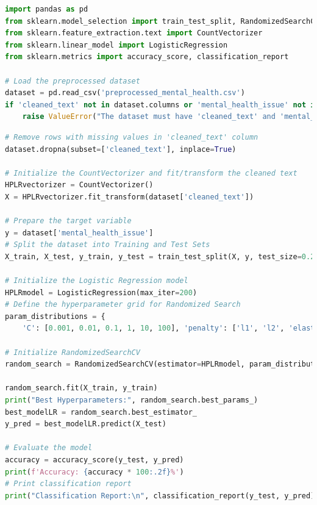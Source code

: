 \begin{tcolorbox}[colback=gray!5!white, colframe=gray!80!black, boxrule=0.5pt, title=Logistic Regression]
\begin{lstlisting}[language=Python]
import pandas as pd
from sklearn.model_selection import train_test_split, RandomizedSearchCV
from sklearn.feature_extraction.text import CountVectorizer
from sklearn.linear_model import LogisticRegression
from sklearn.metrics import accuracy_score, classification_report

# Load the preprocessed dataset
dataset = pd.read_csv('preprocessed_mental_health.csv')
if 'cleaned_text' not in dataset.columns or 'mental_health_issue' not in dataset.columns:
    raise ValueError("The dataset must have 'cleaned_text' and 'mental_health_issue' columns.")
\end{lstlisting}
\end{tcolorbox}

\begin{tcolorbox}[colback=gray!5!white, colframe=gray!80!black, boxrule=0.5pt, title=Logistic Regression]
    \begin{lstlisting}[language=Python]
# Remove rows with missing values in 'cleaned_text' column
dataset.dropna(subset=['cleaned_text'], inplace=True)

# Initialize the CountVectorizer and fit/transform the cleaned text
HPLRvectorizer = CountVectorizer()
X = HPLRvectorizer.fit_transform(dataset['cleaned_text'])

# Prepare the target variable
y = dataset['mental_health_issue']
# Split the dataset into Training and Test Sets
X_train, X_test, y_train, y_test = train_test_split(X, y, test_size=0.2, random_state=42)

# Initialize the Logistic Regression model
HPLRmodel = LogisticRegression(max_iter=200)
# Define the hyperparameter grid for Randomized Search
param_distributions = {
    'C': [0.001, 0.01, 0.1, 1, 10, 100], 'penalty': ['l1', 'l2', 'elasticnet', 'none'], 'solver': ['liblinear', 'saga']}

# Initialize RandomizedSearchCV
random_search = RandomizedSearchCV(estimator=HPLRmodel, param_distributions=param_distributions, n_iter=10, scoring='accuracy', cv=5, n_jobs=-1, random_state=42)

random_search.fit(X_train, y_train)
print("Best Hyperparameters:", random_search.best_params_)
best_modelLR = random_search.best_estimator_
y_pred = best_modelLR.predict(X_test)

# Evaluate the model
accuracy = accuracy_score(y_test, y_pred)
print(f'Accuracy: {accuracy * 100:.2f}%')
# Print classification report
print("Classification Report:\n", classification_report(y_test, y_pred))
\end{lstlisting}
\end{tcolorbox}


